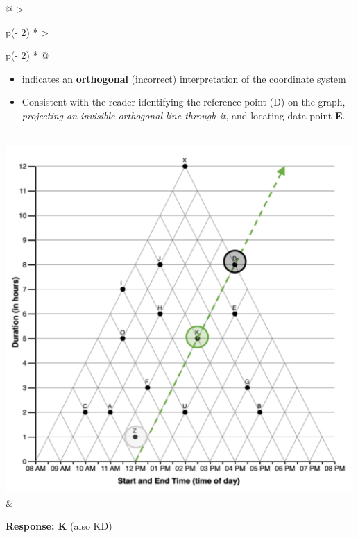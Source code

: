 \documentclass[
  letterpaper,
  DIV=11,
  numbers=noendperiod]{scrreprt}
\begin{document}
\begin{longtable}[]{@{}
  >{\raggedright\arraybackslash}p{(\columnwidth - 2\tabcolsep) * }
  >{\raggedright\arraybackslash}p{(\columnwidth - 2\tabcolsep) * }@{}}
\begin{minipage}[t]{\linewidth}
\begin{itemize}
\item
  indicates an \textbf{orthogonal} (incorrect) interpretation of the
  coordinate system
\item
  Consistent with the reader identifying the reference point (D) on the
  graph, \emph{projecting an invisible orthogonal line through it}, and
  locating data point \textbf{E}.
\end{itemize}
\end{minipage} \\
\includegraphics[width=5.20833in,height=\textheight]{analysis/SGC3A/static/interpretations/Q2_111_TRI.png}
& \begin{minipage}[t]{\linewidth}\raggedright
\textbf{Response: K} (also KD)


\end{minipage}
\end{longtable}
\end{document}
